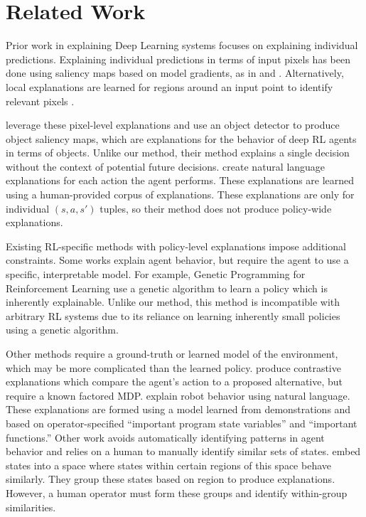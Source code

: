 \documentclass[letterpaper]{article} %
\begin{document}
\section{Related Work}
Prior work in explaining Deep Learning systems focuses on explaining individual predictions.
Explaining individual predictions in terms of input pixels has been done using saliency maps based on model gradients, as in \cite{image_FI_13} and \cite{image_FI_samek}.
Alternatively, local explanations are learned for regions around an input point to identify relevant pixels \cite{image_FI_dog}.

\cite{katia} leverage these pixel-level explanations and use an object detector to produce object saliency maps, which are explanations for the behavior of deep RL agents in terms of objects.
Unlike our method, their method explains a single decision without the context of potential future decisions.
\cite{frogger} create natural language explanations for each action the agent performs.
These explanations are learned using a human-provided corpus of explanations.
These explanations are only for individual $(s,a,s')$ tuples, so their method does not produce policy-wide explanations.

Existing RL-specific methods with policy-level explanations impose additional constraints.
Some works explain agent behavior, but require the agent to use a specific, interpretable model.
For example, Genetic Programming for Reinforcement Learning \cite{genetic} use a genetic algorithm to learn a policy which is inherently explainable.
Unlike our method, this method is incompatible with arbitrary RL systems due to its reliance on learning inherently small policies using a genetic algorithm.

Other methods require a ground-truth or learned model of the environment, which may be more complicated than the learned policy. \cite{MinSufExp} produce contrastive explanations which compare the agent's action to a proposed alternative, but require a known factored MDP. \cite{ImpRoboticController} explain robot behavior using natural language. These explanations are formed using a model learned from demonstrations and based on operator-specified ``important program state variables'' and ``important functions.''
Other work avoids automatically identifying patterns in agent behavior and relies on a human to manually identify similar sets of states. \cite{cluster_drl} embed states into a space where states within certain regions of this space behave similarly. They group these states based on region to produce explanations. However, a human operator must form these groups and identify within-group similarities.
\end{document}
